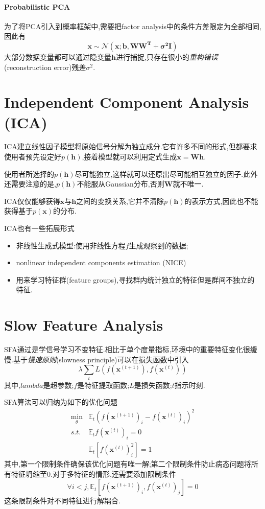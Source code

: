 \paragraph{Probabilistic PCA}

为了将PCA引入到概率框架中,需要把factor analysis中的条件方差限定为全部相同,因此有
\begin{equation}
\bm x\sim\mathcal N(\bm{x;b,WW^T+\sigma^2I})
\end{equation}
大部分数据变量都可以通过隐变量$\bm h$进行捕捉,只存在很小的\textit{重构错误}(reconstruction error)残差$\sigma^2$.

\section{Independent Component Analysis (ICA)}

ICA建立线性因子模型将原始信号分解为独立成分.它有许多不同的形式,但都要求使用者预先设定好$p(\bm h)$,接着模型就可以利用定式生成$\bm{x=Wh}$.

使用者所选择的$p(\bm h)$尽可能独立,这样就可以还原出尽可能相互独立的因子.此外还需要注意的是,$p(\bm h)$不能服从Gaussian分布,否则$\bm W$就不唯一.

ICA仅仅能够获得$\bm x$与$\bm h$之间的变换关系,它并不清除$p(\bm h)$的表示方式,因此也不能获得基于$p(\bm x)$的分布.

ICA也有一些拓展形式
\begin{itemize}
    \item 非线性生成式模型:使用非线性方程$f$生成观察到的数据;
    \item nonlinear independent components estimation (NICE)
    \item 用来学习特征群(feature groups),寻找群内统计独立的特征但是群间不独立的特征.
\end{itemize}

\section{Slow Feature Analysis}

SFA通过是学信号学习不变特征.相比于单个度量指标,环境中的重要特征变化很缓慢.基于\textit{慢速原则}(slowness principle)可以在损失函数中引入
\begin{equation}
\lambda\sum_tL(f(\bm x^{(t+1)}),f(\bm x^{(t)}))
\end{equation}
其中,$lambda$是超参数;$f$是特征提取函数;$L$是损失函数;$t$指示时刻.

SFA算法可以归纳为如下的优化问题
\begin{equation}\begin{split}
\min_{\theta}&\mathbb E_t(f(\bm x^{(t+1)})_i-f(\bm x^{(t)})_i)^2\\
s.t.&\mathbb E_tf(\bm x^{(t)})_i=0\\
&\mathbb E_t[f(\bm x^{(t)})_i^2]=1
\end{split}\end{equation}
其中,第一个限制条件确保该优化问题有唯一解;第二个限制条件防止病态问题将所有特征坍缩至$0$.对于多特征的情形,还需要添加限制条件
\begin{equation}
\forall i<j,\mathbb E_t[f(\bm x^{(t+1)})_i,f(\bm x^{(t)})_j]=0
\end{equation}
这条限制条件对不同特征进行解耦合.

